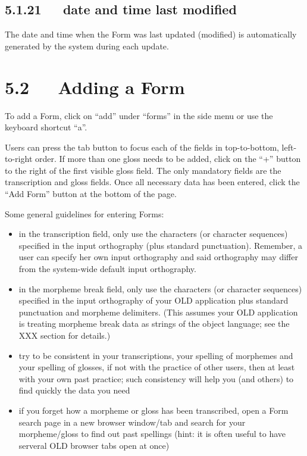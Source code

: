 \documentclass[letterpaper,10pt,english]{sphinxmanual}
\begin{document}
\subsection{5.1.21   date and time last modified}
\label{user_guide:date-and-time-last-modified}
The date and time when the Form was last updated (modified) is automatically
generated by the system during each update.


\section{5.2   Adding a Form}
\label{user_guide:adding-a-form}
To add a Form, click on ``add'' under ``forms'' in the side menu or use the keyboard
shortcut ``a''.

Users can press the tab button to focus each of the fields in top-to-bottom,
left-to-right order.  If more than one gloss needs to be added, click on the ``+''
button to the right of the first visible gloss field.  The only mandatory fields
are the transcription and gloss fields.  Once all necessary data has been
entered, click the ``Add Form'' button at the bottom of the page.

Some general guidelines for entering Forms:
\begin{itemize}
\item {} 
in the transcription field, only use the characters (or character sequences)
specified in the input orthography (plus standard punctuation).  Remember,
a user can specify her own input orthography and said orthography may differ
from the system-wide default input orthography.

\item {} 
in the morpheme break field, only use the characters (or character sequences)
specified in the input orthography of your OLD application plus standard
punctuation and morpheme delimiters.  (This assumes your OLD application is
treating morpheme break data as strings of the object language; see the XXX
section for details.)

\item {} 
try to be consistent in your transcriptions, your spelling of morphemes and
your spelling of glosses, if not with the practice of other users, then at
least with your own past practice; such consistency will help you (and others)
to find quickly the data you need

\item {} 
if you forget how a morpheme or gloss has been transcribed, open a Form search
page in a new browser window/tab and search for your morpheme/gloss to find
out past spellings (hint: it is often useful to have serveral OLD browser tabs
open at once)

\end{itemize}
\end{document}
